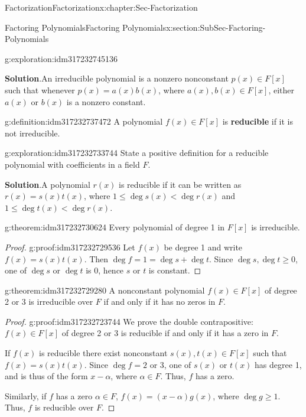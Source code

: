 \documentclass[oneside,10pt,]{book}
\newcommand{\blocktitlefont}{\relax}
\newcommand{\terminology}[1]{\textbf{#1}}
\numberwithin{equation}{section}
\renewcommand{\le}{\leqslant}
\renewcommand{\ge}{\geqslant}
\newcommand{\lt}{<}
\begin{document}
\begin{chapterptx}{Factorization}{}{Factorization}{}{}{x:chapter:Sec-Factorization}
\begin{sectionptx}{Factoring Polynomials}{}{Factoring Polynomials}{}{}{x:section:SubSec-Factoring-Polynomials}
\begin{exploration}{}{g:exploration:idm317232745136}
\par\smallskip%
\noindent\textbf{\blocktitlefont Solution}.\hypertarget{g:solution:idm317232737824}{}\quad{}An irreducible polynomial is a nonzero nonconstant \(p(x)\in F[x]\) such that whenever \(p(x) = a(x) b(x)\), where \(a(x), b(x) \in F[x]\), either \(a(x)\) or \(b(x)\) is a nonzero constant.%
\end{exploration}
\begin{definition}{}{g:definition:idm317232737472}%
A polynomial \(f(x)\in F[x]\) is \terminology{reducible} if it is not irreducible.%
\end{definition}
\begin{exploration}{}{g:exploration:idm317232733744}%
State a positive definition for a reducible polynomial with coefficients in a field \(F\).%
\par\smallskip%
\noindent\textbf{\blocktitlefont Solution}.\hypertarget{g:solution:idm317232732672}{}\quad{}A polynomial \(r(x)\) is reducible if it can be written as \(r(x) = s(x) t(x)\), where \(1 \le \deg s(x) \lt \deg r(x)\) and \(1 \le \deg t(x) \lt \deg r(x)\).%
\end{exploration}
\begin{theorem}{}{}{g:theorem:idm317232730624}%
Every polynomial of degree 1 in \(F[x]\) is irreducible.%
\end{theorem}
\begin{proof}{}{g:proof:idm317232729536}
Let \(f(x)\) be degree 1 and write \(f(x) = s(x) t(x)\). Then \(\deg f = 1 = \deg s + \deg t\). Since \(\deg s, \deg t \ge 0\), one of \(\deg s\) or \(\deg t\) is 0, hence \(s\) or \(t\) is constant.%
\end{proof}
\begin{theorem}{}{}{g:theorem:idm317232729280}%
A nonconstant polynomial \(f(x)\in F[x]\) of degree 2 or 3 is irreducible over \(F\) if and only if it has no zeros in \(F\).%
\end{theorem}
\begin{proof}{}{g:proof:idm317232723744}
We prove the double contrapositive: \(f(x)\in F[x]\) of degree 2 or 3 is reducible if and only if it has a zero in \(F\).%
\par
If \(f(x)\) is reducible there exist nonconstant \(s(x),t(x)\in F[x]\) such that \(f(x) = s(x) t(x)\). Since \(\deg f = 2\) or 3, one of \(s(x)\) or \(t(x)\) has degree 1, and is thus of the form \(x-\alpha\), where \(\alpha \in F\). Thus, \(f\) has a zero.%
\par
Similarly, if \(f\) has a zero \(\alpha\in F\), \(f(x) = (x-\alpha)g(x)\), where \(\deg g \ge 1\). Thus, \(f\) is reducible over \(F\).%

\end{proof}
\end{sectionptx}
\end{chapterptx}
\end{document}
